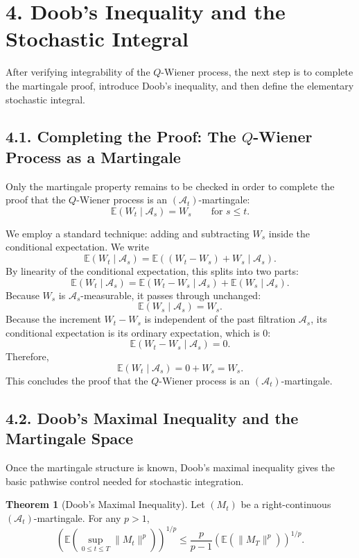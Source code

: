 \documentclass[11pt]{article}
\theoremstyle{definition}
\newtheorem{theorem}{Theorem}
\theoremstyle{remark}
\begin{document}
\section*{4. Doob's Inequality and the Stochastic Integral}
After verifying integrability of the \(Q\)-Wiener process, the next step is to complete the martingale proof, introduce Doob's inequality, and then define the elementary stochastic integral.

\subsection*{4.1. Completing the Proof: The \(Q\)-Wiener Process as a Martingale}
Only the martingale property remains to be checked in order to complete the proof that the \(Q\)-Wiener process is an \((\mathcal A_t)\)-martingale:
\[
\mathbb E(W_t\mid \mathcal A_s)=W_s
\qquad \text{for } s\le t.
\]

We employ a standard technique: adding and subtracting \(W_s\) inside the conditional expectation. We write
\[
\mathbb E(W_t\mid \mathcal A_s)
=
\mathbb E((W_t-W_s)+W_s\mid \mathcal A_s).
\]
By linearity of the conditional expectation, this splits into two parts:
\[
\mathbb E(W_t\mid \mathcal A_s)
=
\mathbb E(W_t-W_s\mid \mathcal A_s)+\mathbb E(W_s\mid \mathcal A_s).
\]
Because \(W_s\) is \(\mathcal A_s\)-measurable, it passes through unchanged:
\[
\mathbb E(W_s\mid \mathcal A_s)=W_s.
\]
Because the increment \(W_t-W_s\) is independent of the past filtration \(\mathcal A_s\), its conditional expectation is its ordinary expectation, which is \(0\):
\[
\mathbb E(W_t-W_s\mid \mathcal A_s)=0.
\]
Therefore,
\[
\mathbb E(W_t\mid \mathcal A_s)=0+W_s=W_s.
\]
This concludes the proof that the \(Q\)-Wiener process is an \((\mathcal A_t)\)-martingale.

\subsection*{4.2. Doob's Maximal Inequality and the Martingale Space}
Once the martingale structure is known, Doob's maximal inequality gives the basic pathwise control needed for stochastic integration.

\begin{theorem}[Doob's Maximal Inequality]
Let \((M_t)\) be a right-continuous \((\mathcal A_t)\)-martingale. For any \(p>1\),
\[
\left(\mathbb E\left(\sup_{0\le t\le T}\|M_t\|^p\right)\right)^{1/p}
\le
\frac{p}{p-1}\left(\mathbb E(\|M_T\|^p)\right)^{1/p}.
\]
\end{theorem}
\end{document}
